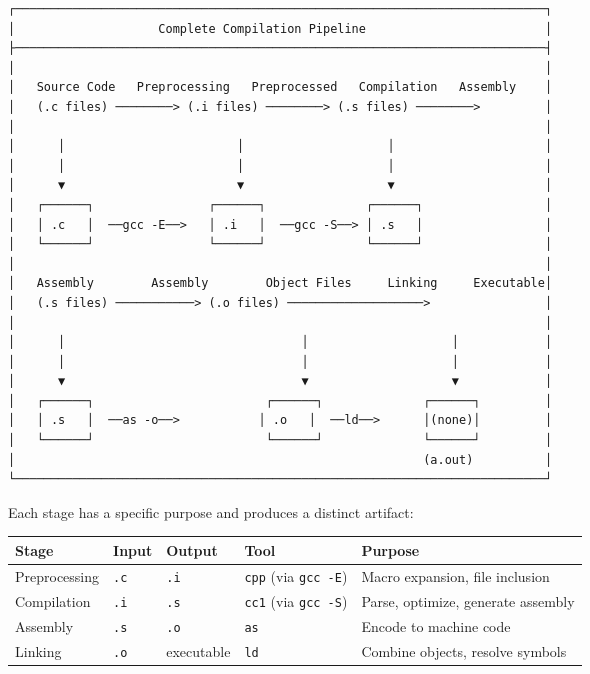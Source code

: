 \begin{verbatim}
┌──────────────────────────────────────────────────────────────────────────┐
│                    Complete Compilation Pipeline                         │
├──────────────────────────────────────────────────────────────────────────┤
│                                                                          │
│   Source Code   Preprocessing   Preprocessed   Compilation   Assembly    │
│   (.c files) ────────> (.i files) ────────> (.s files) ────────>         │
│                                                                          │
│      │                        │                    │                     │
│      │                        │                    │                     │
│      ▼                        ▼                    ▼                     │
│   ┌──────┐                ┌──────┐              ┌──────┐                 │
│   │ .c   │  ──gcc -E──>   │ .i   │  ──gcc -S──> │ .s   │                 │
│   └──────┘                └──────┘              └──────┘                 │
│                                                                          │
│   Assembly        Assembly        Object Files     Linking     Executable│
│   (.s files) ───────────> (.o files) ───────────────────>                │
│                                                                          │
│      │                                 │                    │            │
│      │                                 │                    │            │
│      ▼                                 ▼                    ▼            │
│   ┌──────┐                        ┌──────┐              ┌──────┐         │
│   │ .s   │  ──as -o──>           │ .o   │  ──ld──>      │(none)│         │
│   └──────┘                        └──────┘              └──────┘         │
│                                                         (a.out)          │
└──────────────────────────────────────────────────────────────────────────┘
\end{verbatim}

Each stage has a specific purpose and produces a distinct artifact:

\begin{center}
\begin{tabular}{|l|l|l|l|l|}
\hline
\textbf{Stage} & \textbf{Input} & \textbf{Output} & \textbf{Tool} & \textbf{Purpose} \\
\hline
Preprocessing & \texttt{.c} & \texttt{.i} & \texttt{cpp} (via \texttt{gcc -E}) & Macro expansion, file inclusion \\
\hline
Compilation & \texttt{.i} & \texttt{.s} & \texttt{cc1} (via \texttt{gcc -S}) & Parse, optimize, generate assembly \\
\hline
Assembly & \texttt{.s} & \texttt{.o} & \texttt{as} & Encode to machine code \\
\hline
Linking & \texttt{.o} & executable & \texttt{ld} & Combine objects, resolve symbols \\
\hline
\end{tabular}
\end{center}

